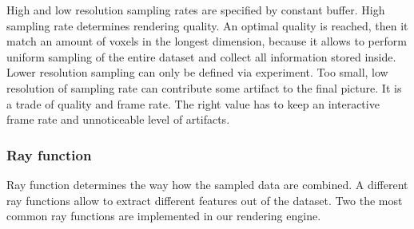 \documentclass[twoside, english, 11pt]{report}
\begin{document}
High and low resolution sampling rates are specified by constant buffer. High sampling rate determines rendering quality. An optimal quality is reached, then it match an amount of voxels in the longest dimension, because it allows to perform uniform sampling of the entire dataset and collect all information stored inside. Lower resolution sampling can only be defined via experiment. Too small, low resolution of sampling rate can contribute some artifact to the final picture. It is a trade of quality and frame rate. The right value has to keep an interactive frame rate and unnoticeable level of artifacts.


\subsubsection{Ray function}
Ray function determines the way how the sampled data are combined. A different ray functions allow to extract different features out of the dataset. Two the most common ray functions are implemented in our rendering engine.\\
\end{document}
